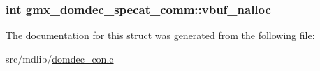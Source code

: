 \hypertarget{structgmx__domdec__specat__comm_a9f2944932f97daf251be270ddeffc844}{
\subsubsection[{vbuf\-\_\-nalloc}]{\setlength{\rightskip}{0pt plus 5cm}int {\bf gmx\-\_\-domdec\-\_\-specat\-\_\-comm\-::vbuf\-\_\-nalloc}}}\label{structgmx__domdec__specat__comm_a9f2944932f97daf251be270ddeffc844}


\-The documentation for this struct was generated from the following file\-:\begin{DoxyCompactItemize}
\item 
src/mdlib/\hyperlink{domdec__con_8c}{domdec\-\_\-con.\-c}\end{DoxyCompactItemize}
